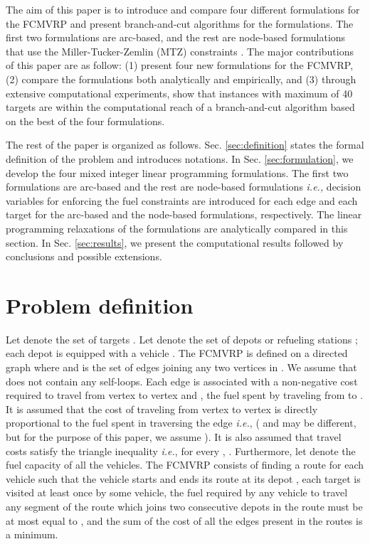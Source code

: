 \documentclass[letterpaper, 10pt, conference]{ieeeconf}
\begin{document}
The aim of this paper is to introduce and compare four different formulations for the FCMVRP and present branch-and-cut algorithms for the formulations. The first two formulations are arc-based, and the rest are node-based formulations that use the Miller-Tucker-Zemlin (MTZ) constraints \cite{MTZ1960}. The major contributions of this paper are as follow: (1) present four new formulations for the FCMVRP, (2) compare the formulations both analytically and empirically, and (3) through extensive computational experiments, show that instances with maximum of 40 targets are within the computational reach of a branch-and-cut algorithm based on the best of the four formulations. 

The rest of the paper is organized as follows. Sec. \ref{sec:definition} states the formal definition of the problem and introduces notations. In Sec. \ref{sec:formulation}, we develop the four mixed integer linear programming formulations. The first two formulations are arc-based and the rest are node-based formulations \emph{i.e.,} decision variables for enforcing the fuel constraints are introduced for each edge and each target for the arc-based and the node-based formulations, respectively. The linear programming relaxations of the formulations are analytically compared in this section. In Sec. \ref{sec:results}, we present the computational results followed by conclusions and possible extensions. 

\section{Problem definition \label{sec:definition}}
Let  denote the set of targets  . Let  denote the set of depots or refueling stations ; each depot  is equipped with a vehicle . The FCMVRP is defined on a directed graph  where  and  is the set of edges joining any two vertices in . We assume that  does not contain any self-loops. Each edge  is associated with a non-negative cost  required to travel from vertex  to vertex  and , the fuel spent by traveling from  to . It is assumed that the cost of traveling from vertex  to vertex  is directly proportional to the fuel spent in traversing the edge  \emph{i.e.},  ( and  may be different, but for the purpose of this paper, we assume ). It is also assumed that travel costs satisfy the triangle inequality \emph{i.e.}, for every , . Furthermore, let  denote the fuel capacity of all the vehicles. The FCMVRP consists of finding a route for each vehicle such that the vehicle  starts and ends its route at its depot , each target is visited at least once by some vehicle, the fuel required by any vehicle to travel any segment of the route which joins two consecutive depots in the route must be at most equal to , and the sum of the cost of all the edges present in the routes is a minimum.
\end{document}
